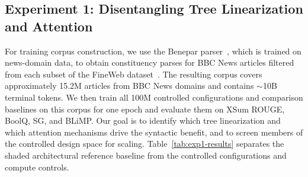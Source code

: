 \documentclass[11pt]{article}
\begin{document}
\begin{table}[htbp]
  \caption{Key 100M and 500M results on BBC News. The shaded row is an architectural reference baseline for reference only, not a member of the controlled variant family. XSum reports R-AVG; XSum and BoolQ show mean $\pm$ sample standard deviation over five fine-tuning seeds. Other metrics are single evaluations. S/C = STACK/COMPOSE; N+S/C and C+S/C mix it at head level with Nomask and causal attention, respectively. Stack bias is Pushdown's stack-depth bias, derived from its attachment parser. Highest means per scale and best available single-evaluation values are in \textbf{bold}. $\ddagger$Doc-PPL protocols are detailed in Appendix~\ref{sec:ppl-protocol-details}.}
  \label{tab:exp1-results}
\end{table}

\subsection{Experiment 1: Disentangling Tree Linearization and Attention}
\label{sec:exp1}

For training corpus construction, we use the Benepar parser~\cite{kitaev-klein-2018-constituency}, which is trained on news-domain data, to obtain constituency parses for BBC News articles filtered from each subset of the FineWeb dataset~\cite{penedo2024fineweb}. 
The resulting corpus covers approximately 15.2M articles from BBC News domains and contains $\sim$10B terminal tokens.
We then train all 100M controlled configurations and comparison baselines on this corpus for one epoch and evaluate them on XSum ROUGE, BoolQ, SG, and BLiMP.
Our goal is to identify which tree linearization and which attention mechanisms drive the syntactic benefit, and to screen members of the controlled design space for scaling.
Table~\ref{tab:exp1-results} separates the shaded architectural reference baseline from the controlled configurations and compute controls.
\end{document}

